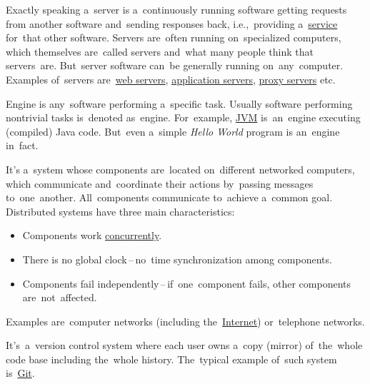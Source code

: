 \label{server}
Exactly speaking a~server is a~continuously running software getting requests from another software and~sending responses back, i.e.,~providing a~\hyperref[applicationprocessprogramservicethread]{service} for~that other software.
Servers are~often running on~specialized computers, which themselves are~called servers and~what many people think that servers~are.
But~server software can~be generally running on~any~computer.
Examples of~servers are~\hyperref[webserver]{web servers}, \hyperref[applicationserver]{application servers}, \hyperref[proxy]{proxy servers} etc.

\label{engine}
Engine is any~software performing a~specific task.
Usually software performing nontrivial tasks is~denoted as~engine.
For~example, \hyperref[jdkjrejvm]{JVM} is~an~engine executing (compiled) Java code.
But~even a~simple \textit{Hello World} program is an~engine in~fact.

\label{distributedsystem}
It's a~system whose components are~located on~different networked computers, which communicate and~coordinate their actions by~passing messages to~one~another.
All~components communicate to~achieve a~common goal.
Distributed systems have three main characteristics:
\begin{itemize}
    \item Components work \hyperref[concurrency]{concurrently}.
    \item There is no global clock\,--\,no~time synchronization among components.
    \item Components fail independently\,--\,if~one~component fails, other components are~not~affected.
\end{itemize}
\noindent Examples are~computer networks (including the~\hyperref[internetweb]{Internet}) or~telephone networks.

\label{distributedversioncontrolsystem}
It's~a~version control system where each user owns a~copy (mirror) of~the~whole code base including the~whole history.
The~typical example of~such system is~\hyperref[git]{Git}.

\label{multitasking}

\label{concurrency}

\label{loosetightcoupling}

